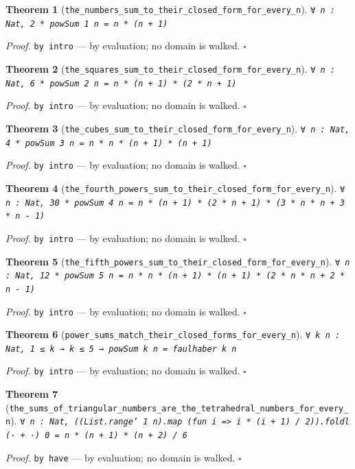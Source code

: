 \documentclass[11pt]{article}
\newtheorem{theorem}{Theorem}[section]
\begin{document}
\begin{theorem}[\texttt{the\_numbers\_sum\_to\_their\_closed\_form\_for\_every\_n}]
\texttt{∀ n : Nat, 2 * powSum 1 n = n * (n + 1)}
\end{theorem}
\noindent\emph{Proof.} \texttt{by
  intro} --- by evaluation; no domain is walked. \hfill$\square$

\begin{theorem}[\texttt{the\_squares\_sum\_to\_their\_closed\_form\_for\_every\_n}]
\texttt{∀ n : Nat, 6 * powSum 2 n = n * (n + 1) * (2 * n + 1)}
\end{theorem}
\noindent\emph{Proof.} \texttt{by
  intro} --- by evaluation; no domain is walked. \hfill$\square$

\begin{theorem}[\texttt{the\_cubes\_sum\_to\_their\_closed\_form\_for\_every\_n}]
\texttt{∀ n : Nat, 4 * powSum 3 n = n * n * (n + 1) * (n + 1)}
\end{theorem}
\noindent\emph{Proof.} \texttt{by
  intro} --- by evaluation; no domain is walked. \hfill$\square$

\begin{theorem}[\texttt{the\_fourth\_powers\_sum\_to\_their\_closed\_form\_for\_every\_n}]
\texttt{∀ n : Nat, 30 * powSum 4 n = n * (n + 1) * (2 * n + 1) * (3 * n * n + 3 * n - 1)}
\end{theorem}
\noindent\emph{Proof.} \texttt{by
  intro} --- by evaluation; no domain is walked. \hfill$\square$

\begin{theorem}[\texttt{the\_fifth\_powers\_sum\_to\_their\_closed\_form\_for\_every\_n}]
\texttt{∀ n : Nat, 12 * powSum 5 n = n * n * (n + 1) * (n + 1) * (2 * n * n + 2 * n - 1)}
\end{theorem}
\noindent\emph{Proof.} \texttt{by
  intro} --- by evaluation; no domain is walked. \hfill$\square$

\begin{theorem}[\texttt{power\_sums\_match\_their\_closed\_forms\_for\_every\_n}]
\texttt{∀ k n : Nat, 1 ≤ k → k ≤ 5 → powSum k n = faulhaber k n}
\end{theorem}
\noindent\emph{Proof.} \texttt{by
  intro} --- by evaluation; no domain is walked. \hfill$\square$

\begin{theorem}[\texttt{the\_sums\_of\_triangular\_numbers\_are\_the\_tetrahedral\_numbers\_for\_every\_n}]
\texttt{∀ n : Nat, ((List.range' 1 n).map (fun i => i * (i + 1) / 2)).foldl (· + ·) 0 = n * (n + 1) * (n + 2) / 6}
\end{theorem}
\noindent\emph{Proof.} \texttt{by
  have} --- by evaluation; no domain is walked. \hfill$\square$
\end{document}
